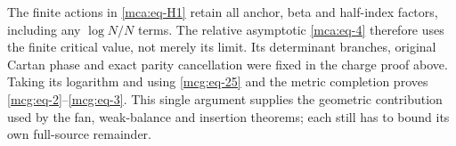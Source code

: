 The finite actions in \eqref{mca:eq-H1} retain all anchor, beta and
half-index factors, including any \(\log N/N\) terms. The relative
asymptotic \eqref{mca:eq-4} therefore uses the finite critical value,
not merely its limit. Its determinant branches, original Cartan phase
and exact parity cancellation were fixed in the charge proof above.
Taking its logarithm and using \eqref{mcg:eq-25} and the metric completion
proves \eqref{mcg:eq-2}--\eqref{mcg:eq-3}. This single argument supplies
the geometric contribution used by the fan, weak-balance and insertion
theorems; each still has to bound its own full-source remainder.
